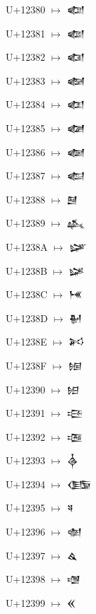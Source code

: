 {\noindent U+12380  $\mapsto$ {\cufont 𒎀}\par
\noindent U+12381  $\mapsto$ {\cufont 𒎁}\par
\noindent U+12382  $\mapsto$ {\cufont 𒎂}\par
\noindent U+12383  $\mapsto$ {\cufont 𒎃}\par
\noindent U+12384  $\mapsto$ {\cufont 𒎄}\par
\noindent U+12385  $\mapsto$ {\cufont 𒎅}\par
\noindent U+12386  $\mapsto$ {\cufont 𒎆}\par
\noindent U+12387  $\mapsto$ {\cufont 𒎇}\par
\noindent U+12388  $\mapsto$ {\cufont 𒎈}\par
\noindent U+12389  $\mapsto$ {\cufont 𒎉}\par
\noindent U+1238A  $\mapsto$ {\cufont 𒎊}\par
\noindent U+1238B  $\mapsto$ {\cufont 𒎋}\par
\noindent U+1238C  $\mapsto$ {\cufont 𒎌}\par
\noindent U+1238D  $\mapsto$ {\cufont 𒎍}\par
\noindent U+1238E  $\mapsto$ {\cufont 𒎎}\par
\noindent U+1238F  $\mapsto$ {\cufont 𒎏}\par
\noindent U+12390  $\mapsto$ {\cufont 𒎐}\par
\noindent U+12391  $\mapsto$ {\cufont 𒎑}\par
\noindent U+12392  $\mapsto$ {\cufont 𒎒}\par
\noindent U+12393  $\mapsto$ {\cufont 𒎓}\par
\noindent U+12394  $\mapsto$ {\cufont 𒎔}\par
\noindent U+12395  $\mapsto$ {\cufont 𒎕}\par
\noindent U+12396  $\mapsto$ {\cufont 𒎖}\par
\noindent U+12397  $\mapsto$ {\cufont 𒎗}\par
\noindent U+12398  $\mapsto$ {\cufont 𒎘}\par
\noindent U+12399  $\mapsto$ {\cufont 𒎙}\par
}

